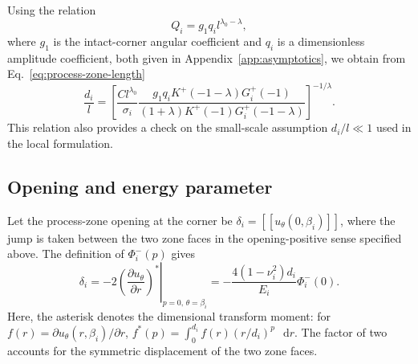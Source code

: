 \documentclass[pdflatex,onecolumn,sn-mathphys-ay]{sn-jnl}
\newcommand{\dd}{\mathop{}\!\mathrm{d}}
\newcommand{\jump}[1]{\left[\!\left[#1\right]\!\right]}
\begin{document}
Using the relation
\begin{equation*}
  Q_i=g_1q_i l^{\lambda_0-\lambda},
\end{equation*}
where $g_1$ is the intact-corner angular coefficient and $q_i$ is a
dimensionless amplitude coefficient, both given in
Appendix~\ref{app:asymptotics}, we obtain from
Eq.~\eqref{eq:process-zone-length}
\begin{equation}
\label{eq:normalized-process-zone-length}
  \frac{d_i}{l}=
  \left[
    \frac{Cl^{\lambda_0}}{\sigma_i}
    \frac{g_1q_iK^+(-1-\lambda)G_i^+(-1)}
    {(1+\lambda)K^+(-1)G_i^+(-1-\lambda)}
  \right]^{-1/\lambda}.
\end{equation}
This relation also provides a check on the small-scale assumption
$d_i/l\ll1$ used in the local formulation.

\subsection{Opening and energy parameter}
\label{subsec:zone-parameters}

Let the process-zone opening at the corner be
$\delta_i=\jump{u_\theta(0,\beta_i)}$, where the jump is taken between the
two zone faces in the opening-positive sense specified above. The definition
of $\Phi_i^-(p)$ gives
\begin{equation*}
  \delta_i
  =-2
    \left.
      \left(\frac{\partial u_\theta}{\partial r}\right)^*
    \right|_{p=0,\,\theta=\beta_i}
  =-\frac{4(1-\nu_i^2)d_i}{E_i}\Phi_i^-(0).
\end{equation*}
Here, the asterisk denotes the dimensional transform moment:
for $f(r)=\partial u_\theta(r,\beta_i)/\partial r$,
$f^*(p)=\int_0^{d_i}f(r)(r/d_i)^p\,\dd r$.
The factor of two accounts for the symmetric displacement of the two
zone faces.
\end{document}
